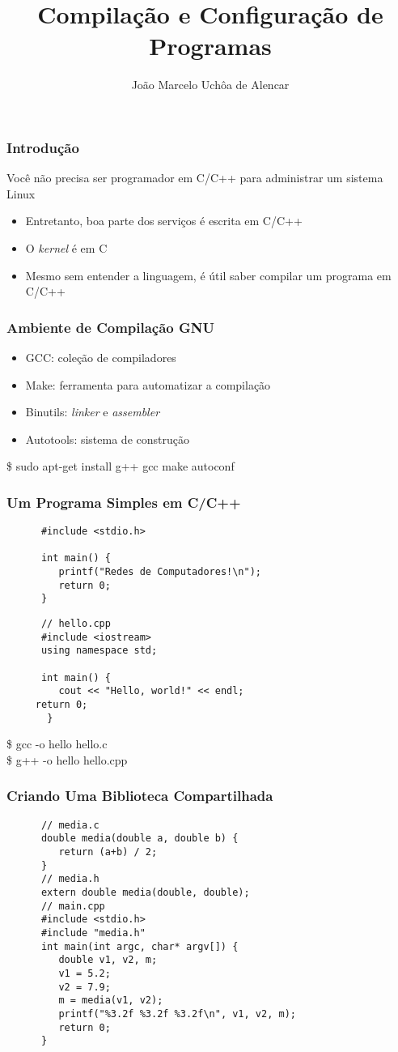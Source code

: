 \documentclass{beamer}
\title{Compilação e Configuração de Programas}
\author[João Marcelo Uchôa de Alencar]{João Marcelo Uchôa de Alencar}
\institute{Universidade Federal do Ceará - Quixadá}
\begin{document}
   \begin{frame}
      \titlepage
   \end{frame}

   \begin{frame}
      \frametitle{Introdução}
      Você não precisa ser programador em C/C++ para administrar um sistema Linux
      \begin{itemize}
         \item Entretanto, boa parte dos serviços é escrita em C/C++
	 \item O \textit{kernel} é em C
	 \item Mesmo sem entender a linguagem, é útil saber compilar um programa em C/C++ 
      \end{itemize}
   \end{frame}

   \begin{frame}
      \frametitle{Ambiente de Compilação GNU}
      \begin{itemize}
         \item GCC: coleção de compiladores
	 \item Make: ferramenta para automatizar a compilação
	 \item Binutils: \textit{linker} e \textit{assembler}
	 \item Autotools: sistema de construção
      \end{itemize}
      \$ sudo apt-get install g++ gcc make autoconf
   \end{frame}

   
   \begin{frame}[fragile]
      \frametitle{Um Programa Simples em C/C++}
      \begin{verbatim}
      #include <stdio.h>
       
      int main() {
         printf("Redes de Computadores!\n");
         return 0;
      }
      \end{verbatim}
      \begin{verbatim}
      // hello.cpp
      #include <iostream>
      using namespace std;
       
      int main() {
         cout << "Hello, world!" << endl;
	 return 0;
       }
      \end{verbatim}
      \$ gcc -o hello hello.c \\
      \$ g++ -o hello hello.cpp
\end{frame}

   \begin{frame}[fragile]
      \frametitle{Criando Uma Biblioteca Compartilhada}
      \begin{verbatim}
      // media.c
      double media(double a, double b) {
         return (a+b) / 2;
      }
      // media.h
      extern double media(double, double);
      // main.cpp
      #include <stdio.h>
      #include "media.h"
      int main(int argc, char* argv[]) {
         double v1, v2, m;
         v1 = 5.2;
         v2 = 7.9;
         m = media(v1, v2);
         printf("%3.2f %3.2f %3.2f\n", v1, v2, m);
         return 0;
      }
      \end{verbatim}
\end{frame}
\end{document}
